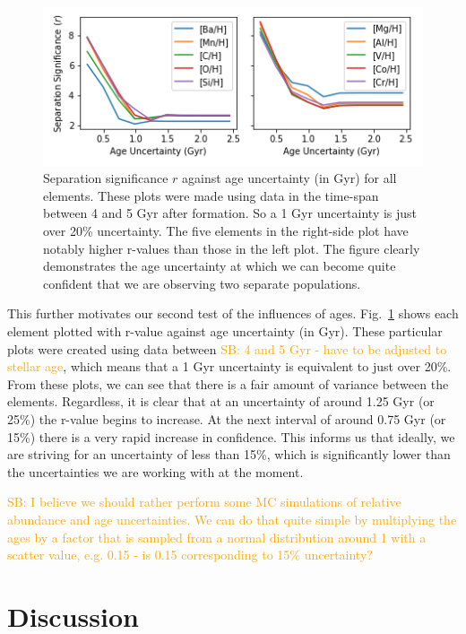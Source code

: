 \documentclass[fleqn,usenatbib]{mnras}
\newcommand{\SB}[1]{{\textcolor{orange}{SB: #1}}}
\begin{document}
\begin{figure}
	\includegraphics[width=\columnwidth]{figures/same_axis_r_age.png}
    \caption{Separation significance $r$ against age uncertainty (in Gyr) for all elements. These plots were made using data in the time-span between 4 and 5 Gyr after formation. So a 1 Gyr uncertainty is just over 20\% uncertainty. The five elements in the right-side plot have notably higher r-values than those in the left plot. The figure clearly demonstrates the age uncertainty at which we can become quite confident that we are observing two separate populations.}
    \label{fig:r_v_age}
\end{figure}

This further motivates our second test of the influences of ages. Fig.~\ref{fig:r_v_age} shows each element plotted with r-value against age uncertainty (in Gyr). These particular plots were created using data between \SB{4 and 5 Gyr - have to be adjusted to stellar age}, which means that a 1 Gyr uncertainty is equivalent to just over 20\%. From these plots, we can see that there is a fair amount of variance between the elements. Regardless, it is clear that at an uncertainty of around 1.25 Gyr (or 25\%) the r-value begins to increase. At the next interval of around 0.75 Gyr (or 15\%) there is a very rapid increase in confidence. This informs us that ideally, we are striving for an uncertainty of less than 15\%, which is significantly lower than the uncertainties we are working with at the moment.

\SB{I believe we should rather perform some MC simulations of relative abundance and age uncertainties. We can do that quite simple by multiplying the ages by a factor that is sampled from a normal distribution around 1 with a scatter value, e.g. 0.15 - is 0.15 corresponding to 15\% uncertainty?}

\section{Discussion} \label{sec:discussion}
\end{document}
